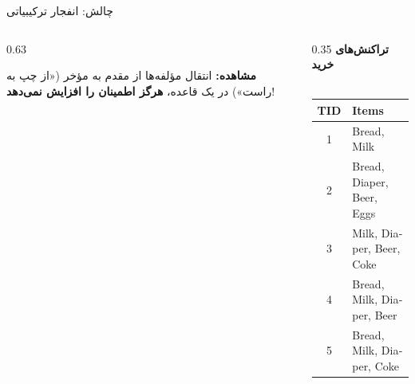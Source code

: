 \begin{frame}{چالش: انفجار ترکیبیاتی}{}
\begin{columns}[T,onlytextwidth]
\begin{column}{0.63\textwidth}
\vspace{-0.1cm}
\begin{tcolorbox}[colback=mannheimgold!15,colframe=mannheimgold!80!black,arc=2pt,left=3pt,right=3pt,top=2pt,bottom=2pt]
\scriptsize \textbf{مشاهده:} انتقال مؤلفه‌ها از مقدم به مؤخر («از چپ به راست») در یک قاعده، \textbf{هرگز اطمینان را افزایش نمی‌دهد}!
\end{tcolorbox}
\end{column}%
\begin{column}{0.35\textwidth}
\centering
\textbf{\small تراکنش‌های خرید}\\[1pt]
{\scriptsize{}}\\[3pt]
\begin{latin}
\fontsize{7.5}{9.5}\selectfont
\begin{tabular}{|c|l|}
\hline
\rowcolor{mannheimblue!15}
\textbf{TID} & \textbf{Items} \\ \hline
1 & Bread, Milk \\ \hline
2 & Bread, Diaper, Beer, Eggs \\ \hline
3 & Milk, Diaper, Beer, Coke \\ \hline
4 & Bread, Milk, Diaper, Beer \\ \hline
5 & Bread, Milk, Diaper, Coke \\ \hline
\end{tabular}
\end{latin}
\end{column}
\end{columns}
\end{frame}


